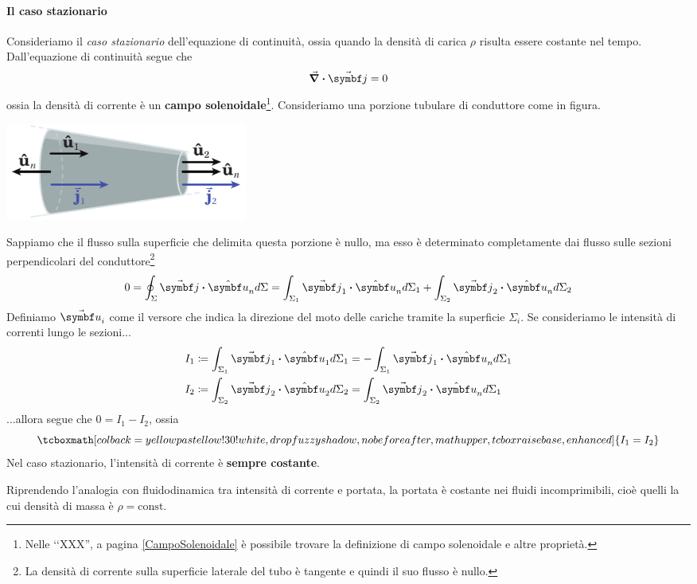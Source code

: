 \paragraph{Il caso stazionario}
	Consideriamo il \textit{caso stazionario} dell'equazione di continuità, ossia quando la densità di carica $\rho$ risulta essere costante nel tempo. Dall'equazione di continuità segue  che
	\begin{equation*}
		\div{\vba{j}}=0
	\end{equation*}
	ossia la densità di corrente è un \textbf{campo solenoidale}\footnote{Nelle ‘‘XXX'', a pagina \ref{CampoSolenoidale} è possibile trovare la definizione di campo solenoidale e altre proprietà.}. Consideriamo una porzione tubulare di conduttore come in figura.
	\begin{center}
		\includegraphics[width=0.35\textwidth]{images/chp5/chp5casostazionario.pdf}
	\end{center}
	Sappiamo che il flusso sulla superficie che delimita questa porzione è nullo, ma esso è determinato completamente dai flusso sulle sezioni perpendicolari del conduttore\footnote{La densità di corrente sulla superficie laterale del tubo è tangente e quindi il suo flusso è nullo.}
	\begin{equation*}
		0=\oint_{\Sigma}\vba{j}\vdot\vbh{u}_nd\Sigma=\int_{\Sigma_1}\vba{j}_1\vdot\vbh{u}_nd\Sigma_1+\int_{\Sigma_2}\vba{j}_2\vdot\vbh{u}_nd\Sigma_2
	\end{equation*}
	Definiamo $\vba{u}_i$ come il versore che indica la direzione del moto delle cariche tramite la superficie $\Sigma_i$. Se consideriamo le intensità di correnti lungo le sezioni...
	\begin{align*}
		I_1&\coloneqq\int_{\Sigma_1}\vba{j}_1\vdot\vbh{u}_1d\Sigma_1=-\int_{\Sigma_1}\vba{j}_1\vdot\vbh{u}_nd\Sigma_1\\
		I_2&\coloneqq\int_{\Sigma_2}\vba{j}_2\vdot\vbh{u}_2d\Sigma_2=\int_{\Sigma_2}\vba{j}_2\vdot\vbh{u}_nd\Sigma_1
	\end{align*}
	...allora segue che $0=I_1-I_2$, ossia
	\begin{equation}
			\tcboxmath[colback=yellowpastellow!30!white,drop fuzzy shadow, nobeforeafter, math upper, tcbox raise base, enhanced]{I_1=I_2}
	\end{equation}
Nel caso stazionario, l'intensità di corrente è \textbf{sempre costante}.
\begin{intuit}
	Riprendendo l'analogia con fluidodinamica tra intensità di corrente e portata, la portata è costante nei fluidi incomprimibili, cioè quelli la cui densità di massa è $\rho=\mathrm{const}$.
\end{intuit}
